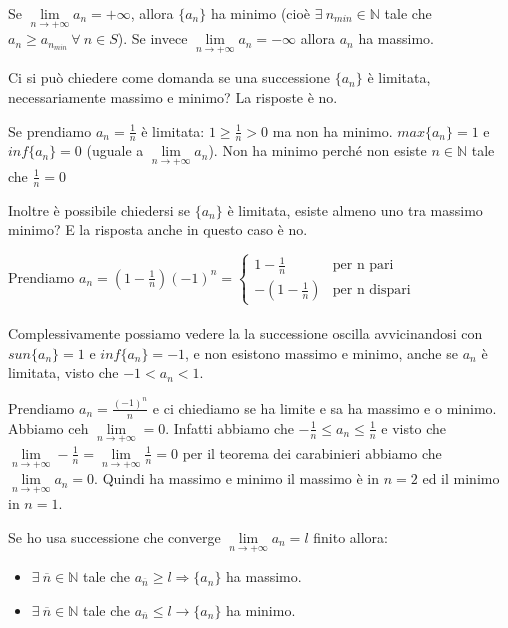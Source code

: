 \begin{theorem}
Se $\lim\limits_{n\to +\infty}a_n = +\infty$, allora $\{a_n\}$ ha minimo (cioè $\exists \:n_{min} \in \mathbb{N}$ tale che $a_n \geq a_{n_{min}} \: \forall \:n \in S$). Se invece $\lim\limits_{n\to +\infty}a_n = -\infty$ allora $a_n$ ha massimo.
\end{theorem}
\hspace{-15pt}Ci si può chiedere come domanda se una successione $\{a_n\}$ è limitata, necessariamente massimo e minimo? La risposte è no.
\begin{example}
Se prendiamo $a_n = \frac{1}{n}$ è limitata: $1 \geq \frac{1}{n} > 0$ ma non ha minimo. $max\{a_n\} = 1$ e $inf\{a_n\} = 0$ (uguale a $\lim\limits_{n\to +\infty} a_n$). Non ha minimo perché non esiste $n \in \mathbb{N}$ tale che $\frac{1}{n} = 0$
\end{example}
\hspace{-15pt}Inoltre è possibile chiedersi se $\{a_n\}$ è limitata, esiste almeno uno tra massimo minimo? E la risposta anche in questo caso è no.
\begin{example}
Prendiamo $a_n = (1-\frac{1}{n})(-1)^n = \begin{cases}1-\frac{1}{n} & \text{per n pari} \\ -(1 - \frac{1}{n}) & \text{per n dispari}\end{cases}$\\\\
Complessivamente possiamo vedere la la successione oscilla avvicinandosi con $sun\{a_n\} = 1$ e $inf\{a_n\} = -1$, e non esistono massimo e minimo, anche se $a_n$ è limitata, visto che $-1 < a_n < 1$.
\end{example}

\begin{example}
Prendiamo $a_n = \frac{(-1)^n}{n}$ e ci chiediamo se ha limite e sa ha massimo e o minimo.\\
Abbiamo ceh $\lim\limits_{n\to +\infty} = 0$. Infatti abbiamo che $-\frac{1}{n} \leq a_n \leq \frac{1}{n}$ e visto che $\lim\limits_{n\to +\infty}-\frac{1}{n}=\lim\limits_{n\to +\infty}\frac{1}{n} = 0$ per il teorema dei carabinieri abbiamo che $\lim\limits_{n\to +\infty}a_n = 0$. Quindi ha massimo e minimo il massimo è in $n=2$ ed il minimo in $n=1$.
\end{example}

\begin{theorem}
Se ho usa successione che converge $\lim\limits_{n\to +\infty}a_n = l$ finito allora:
\begin{itemize}
    \item $\exists \: \overline{n}\in \mathbb{N}$ tale che $a_{\overline{n}} \geq l \Longrightarrow \{a_n\}$ ha massimo.
    \item $\exists \: \overline{n}\in \mathbb{N}$ tale che $a_{\overline{n}} \leq l \longrightarrow \{a_n\}$ ha minimo.
\end{itemize}
\end{theorem}

